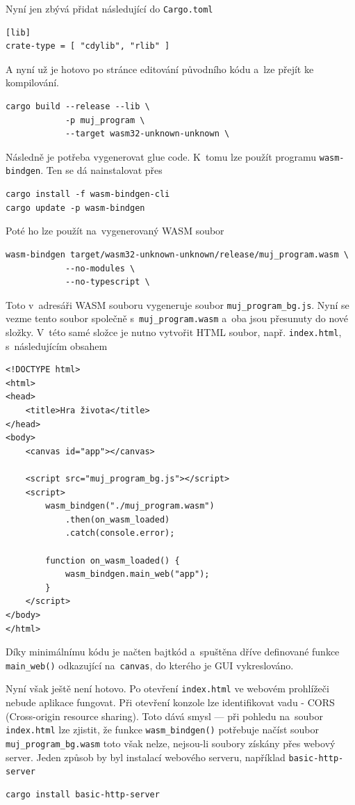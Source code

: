 \documentclass[a4paper, 12pt, twoside]{article} %
\newcommand{\rust}[1]{\texttt{#1}}
\begin{document}
		Nyní jen zbývá přidat následující do \texttt{Cargo.toml}
\begin{verbatim}
[lib]
crate-type = [ "cdylib", "rlib" ]
		\end{verbatim}
		
		A nyní už je hotovo po stránce editování původního kódu a~lze přejít ke kompilování.
		\begin{verbatim}
cargo build --release --lib \
			-p muj_program \
			--target wasm32-unknown-unknown \
		\end{verbatim}
		
		Následně je potřeba vygenerovat glue code. K~tomu lze použít programu \texttt{wasm-bindgen}. Ten se dá nainstalovat přes
		\begin{verbatim}
cargo install -f wasm-bindgen-cli
cargo update -p wasm-bindgen
		\end{verbatim}
		
		Poté ho lze použít na~vygenerovaný WASM soubor
		\begin{verbatim}
wasm-bindgen target/wasm32-unknown-unknown/release/muj_program.wasm \
			--no-modules \
			--no-typescript \
		\end{verbatim}
		
		Toto v~adresáři WASM souboru vygeneruje soubor \texttt{muj\_program\_bg.js}. Nyní se vezme tento soubor společně s~\texttt{muj\_program.wasm} a~oba jsou přesunuty do nové složky. V~této samé složce je nutno vytvořit HTML soubor, např. \texttt{index.html}, s~následujícím obsahem
		\begin{verbatim}
<!DOCTYPE html>
<html>
<head>
	<title>Hra života</title>
</head>
<body>
	<canvas id="app"></canvas>

	<script src="muj_program_bg.js"></script>
	<script>
		wasm_bindgen("./muj_program.wasm")
			.then(on_wasm_loaded)
			.catch(console.error);

		function on_wasm_loaded() {
			wasm_bindgen.main_web("app");
		}
	</script>
</body>
</html>
		\end{verbatim}
		
		Díky minimálnímu kódu je načten bajtkód a~spuštěna dříve definované funkce \rust{main_web()} odkazující na~\texttt{canvas}, do kterého je GUI vykreslováno.
		
		Nyní však ještě není hotovo. Po otevření \texttt{index.html} ve webovém prohlížeči nebude aplikace fungovat. Při otevření konzole lze identifikovat vadu - CORS (Cross-origin resource sharing). Toto dává smysl — při pohledu na~soubor \texttt{index.html} lze zjistit, že funkce \rust{wasm_bindgen()} potřebuje načíst soubor \texttt{muj\_program\_bg.wasm} toto však nelze, nejsou-li soubory získány přes webový server. Jeden způsob by byl instalací webového serveru, například \texttt{basic-http-server}
		\begin{verbatim}
cargo install basic-http-server
		\end{verbatim}
		
\end{document}
